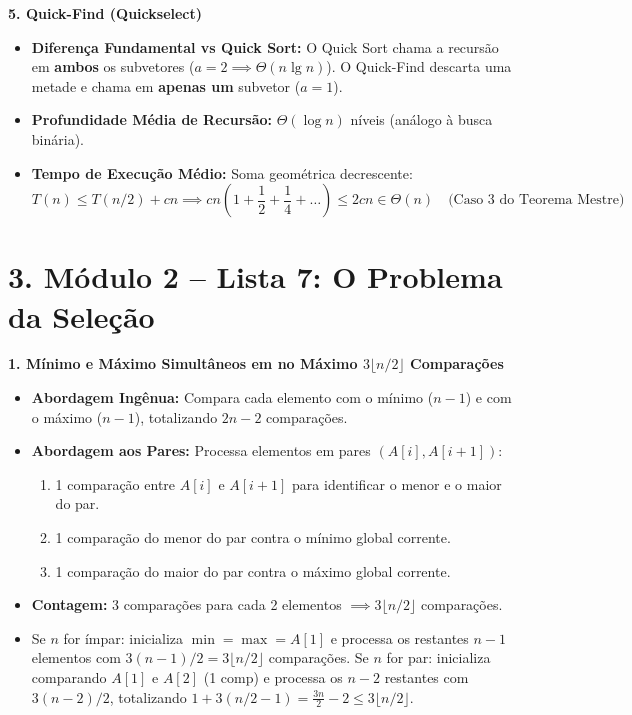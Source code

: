 \documentclass[11pt,a4paper]{article}
\newcommand{\topico}[1]{\par\medskip\textbf{\color{azul}#1}\par}
\newcommand{\secao}[1]{\section*{\color{azul}#1}}
\begin{document}
\topico{5. Quick-Find (Quickselect)}
\begin{itemize}
  \item \textbf{Diferença Fundamental vs Quick Sort:} O Quick Sort chama a recursão em \textbf{ambos} os subvetores ($a = 2 \implies \Theta(n \lg n)$). O Quick-Find descarta uma metade e chama em \textbf{apenas um} subvetor ($a = 1$).
  \item \textbf{Profundidade Média de Recursão:} $\Theta(\log n)$ níveis (análogo à busca binária).
  \item \textbf{Tempo de Execução Médio:} Soma geométrica decrescente:
  \[
  T(n) \le T(n/2) + cn \implies cn\left(1 + \frac{1}{2} + \frac{1}{4} + \dots\right) \le 2cn \in \Theta(n) \quad \text{(Caso 3 do Teorema Mestre)}
  \]
\end{itemize}

\newpage
\newpage
\secao{3. Módulo 2 -- Lista 7: O Problema da Seleção}

\topico{1. Mínimo e Máximo Simultâneos em no Máximo $3\lfloor n/2 \rfloor$ Comparações}
\begin{itemize}
  \item \textbf{Abordagem Ingênua:} Compara cada elemento com o mínimo ($n-1$) e com o máximo ($n-1$), totalizando $2n - 2$ comparações.
  \item \textbf{Abordagem aos Pares:} Processa elementos em pares $(A[i], A[i+1])$:
  \begin{enumerate}
    \item 1 comparação entre $A[i]$ e $A[i+1]$ para identificar o menor e o maior do par.
    \item 1 comparação do menor do par contra o mínimo global corrente.
    \item 1 comparação do maior do par contra o máximo global corrente.
  \end{enumerate}
  \item \textbf{Contagem:} 3 comparações para cada 2 elementos $\implies 3\lfloor n/2 \rfloor$ comparações.
  \item Se $n$ for ímpar: inicializa $\min = \max = A[1]$ e processa os restantes $n-1$ elementos com $3(n-1)/2 = 3\lfloor n/2 \rfloor$ comparações. Se $n$ for par: inicializa comparando $A[1]$ e $A[2]$ (1 comp) e processa os $n-2$ restantes com $3(n-2)/2$, totalizando $1 + 3(n/2 - 1) = \frac{3n}{2} - 2 \le 3\lfloor n/2 \rfloor$.
\end{itemize}
\end{document}
